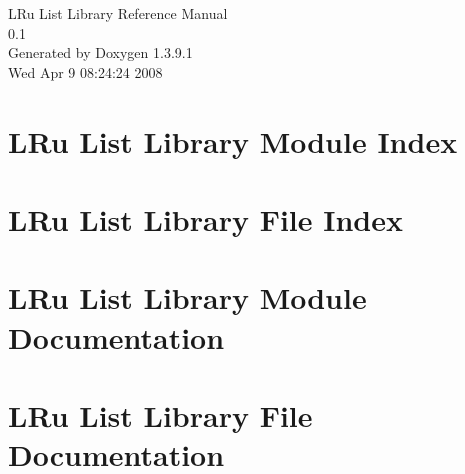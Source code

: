 \documentclass[a4paper]{book}
\begin{document}
\begin{titlepage}
\vspace*{7cm}
\begin{center}
{\Large LRu List Library Reference Manual\\[1ex]\large 0.1 }\\
\vspace*{1cm}
{\large Generated by Doxygen 1.3.9.1}\\
\vspace*{0.5cm}
{\small Wed Apr 9 08:24:24 2008}\\
\end{center}
\end{titlepage}
\clearemptydoublepage
{}
\tableofcontents
\clearemptydoublepage
{}
\chapter{LRu List Library Module Index}

\chapter{LRu List Library File Index}

\chapter{LRu List Library Module Documentation}

\chapter{LRu List Library File Documentation}



\printindex
\end{document}
